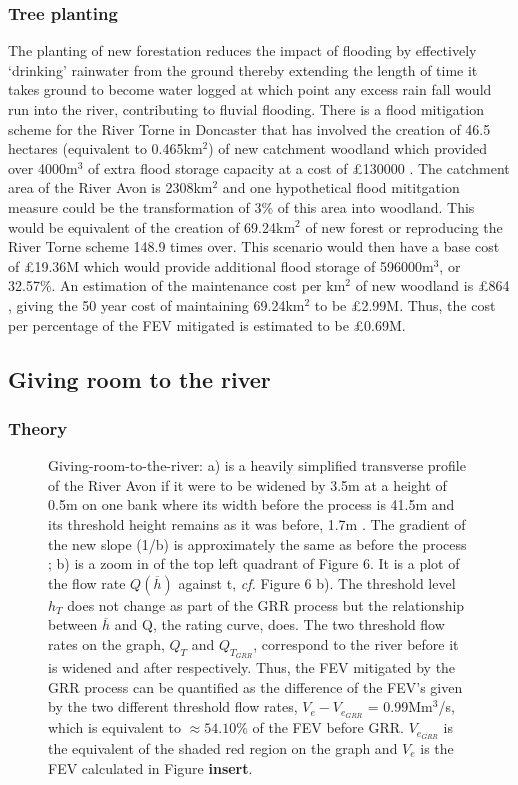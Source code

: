 \documentclass[11pt,a4paper]{article}
\begin{document}
\subsubsection{Tree planting}
The planting of new forestation reduces the impact of flooding by effectively `drinking' rainwater from the ground thereby extending the length of time it takes ground to become water logged at which point any excess rain fall would run into the river, contributing to fluvial flooding. There is a flood mitigation scheme for the River Torne in Doncaster that has involved the creation of 46.5 hectares (equivalent to 0.465km$^2$) of new catchment woodland which provided over 4000m$^3$ of extra flood storage capacity at a cost of \pounds130000 \cite{nfm}. The catchment area of the River Avon is 2308km$^2$ \cite{britannica} and one hypothetical flood mititgation measure could be the transformation of 3\% of this area into woodland. This would be equivalent of the creation of 69.24km$^2$ of new forest or reproducing the River Torne scheme 148.9 times over. This scenario would then have a base cost of \pounds19.36M which would provide additional flood storage of 596000m$^3$, or 32.57\%. An estimation of the maintenance cost per km$^2$ of new woodland is \pounds864 \cite{cost1}, giving the 50 year cost of maintaining 69.24km$^2$ to be \pounds2.99M. Thus, the cost per percentage of the FEV mitigated is estimated to be \pounds0.69M.

\subsection{Giving room to the river}
\subsubsection{Theory}
\begin{figure}[ht!]
\begin{center}
\hfill
{}
\caption{Giving-room-to-the-river: a) is a heavily simplified transverse profile of the River Avon if it were to be widened by 3.5m at a height of 0.5m on one bank where its width before the process is 41.5m and its threshold height remains as it was before, 1.7m \cite{maps}. The gradient of the new slope (1/b) is approximately the same as before the process {;} b) is a zoom in of the top left quadrant of Figure 6. It is a plot of the flow rate $Q(\overline{h})$ against t, \textit{cf.} Figure 6 b). The threshold level $h_T$ does not change as part of the GRR process but the relationship between $\overline{h}$ and Q, the rating curve, does. The two threshold flow rates on the graph, $Q_{T}$ and $Q_{T_{GRR}}$, correspond to the river before it is widened and after respectively. Thus, the FEV mitigated by the GRR process can be quantified as the difference of the FEV's given by the two different threshold flow rates, $V_{e}-V_{e_{GRR}}$ = 0.99Mm$^3$/s, which is equivalent to $\approx 54.10\%$ of the FEV before GRR. $V_{e_{GRR}}$ is the equivalent of the shaded red region on the graph and $V_{e}$ is the FEV calculated in Figure \textbf{insert}.}
\end{center}
\end{figure}
\end{document}
